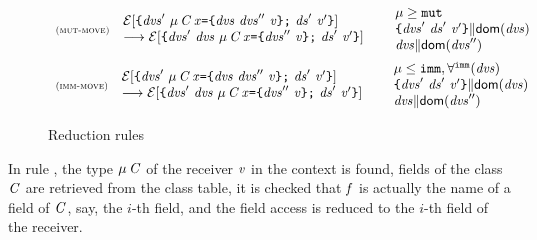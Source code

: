 \begin{figure}[ht]
{\begin{small}
\begin{math}
\begin{array}{l}
%
\NamedRuleOL{mut-move}{
\begin{array}{l}
{
\Ctx{\Block{\dvs'\ \Dec{\Type{\mu}{\C}}{\x}{\Block{\dvs\ \dvs''}{\val}}\ \decs'}{\val'}}
}
\\ \longrightarrow
{
\Ctx{\Block{\dvs'\ \dvs\ \Dec{\Type{\mu}{\C}}{\x}{\Block{\dvs''}{\val}}\ \decs'}{\val'}}
}
\end{array}
}{\begin{array}{l}
\mu \geq \mutable\\
{\noCapture{\Block{\dvs'\ \decs'}{\val'}}{\dom{\dvs}}}\\
{\noCapture{\dvs}{\dom{\dvs''}}}
\end{array}}
\\[4ex]
\NamedRuleOL{imm-move}{
\begin{array}{l}
{
\Ctx{\Block{\dvs'\ \Dec{\Type{\mu}{\C}}{\x}{\Block{\dvs\ \dvs''}{\val}}\ \decs'}{\val'}}
}
\\ \longrightarrow
{
\Ctx{\Block{\dvs'\ \dvs\ \Dec{\Type{\mu}{\C}}{\x}{\Block{\dvs''}{\val}}\ \decs'}{\val'}}
}
\end{array}
}{\begin{array}{l}
\mu \leq \imm, {\allImm{\dvs}}\\
{\noCapture{\Block{\dvs'\ \decs'}{\val'}}{\dom{\dvs}}}\\
{\noCapture{\dvs}{\dom{\dvs''}}}
\end{array}}
\end{array}
\end{math}
\end{small}
}
\caption{Reduction rules}
\label{fig:reduction}
\end{figure}
In rule , the type $\mu\,\mathit{C}$ of the receiver $\mathit{v}$ in the context is found, fields of the class $\mathit{C}$ are retrieved from the class table, it is checked that $\mathit{f}$ is actually the name of a field of $\mathit{C}$, say, the $i$-th field, and the field access is reduced to the $i$-th field of the receiver.

